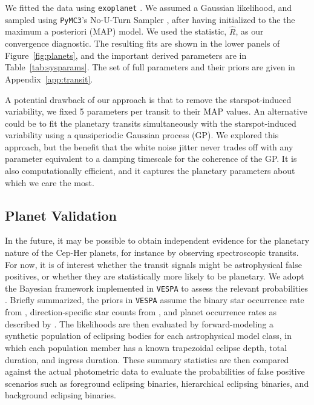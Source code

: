 \documentclass[12pt,twocolumn,tighten,linenumbers,trackchanges]{aastex63}
\begin{document}
We fitted the data using \texttt{exoplanet}
\citep{exoplanet:exoplanet}.  We assumed a Gaussian likelihood, and
sampled using \texttt{PyMC3}'s No-U-Turn Sampler
\citep{hoffman_no-u-turn_2014}, after having initialized to the the
maximum a posteriori (MAP) model.  We used the
\citet{gelman_inference_1992} statistic, $\hat{R}$, as our convergence
diagnostic.  The resulting fits are shown in the lower panels of
Figure~\ref{fig:planets}, and the important derived parameters are in
Table~\ref{tab:sysparams}.  The set of full parameters and their
priors are given in Appendix~\ref{app:transit}.

A potential drawback of our approach is that to remove
the starspot-induced variability, we fixed 5 
parameters per transit to their MAP values.
An alternative could be to fit the
planetary transits simultaneously with the starspot-induced
variability using a quasiperiodic Gaussian process (GP).  We explored
this approach, but  the benefit that the white noise jitter never
trades off with any parameter equivalent to a damping timescale for
the coherence of the GP.  It is also computationally efficient, and it
captures the planetary parameters about which we care the most.


\subsection{Planet Validation}

In the future, it may be possible to obtain independent evidence for
the planetary nature of the Cep-Her planets, for instance by observing
spectroscopic transits.  For now,
it is of interest whether the transit signals might be astrophysical
false positives, or whether they are statistically more likely to be
planetary.  We adopt the Bayesian framework implemented in
\texttt{VESPA} to assess the relevant probabilities
\citep{morton_efficient_2012,vespa_2015}.  Briefly summarized, the
priors in \texttt{VESPA} assume the binary star occurrence rate from
\citet{raghavan_survey_2010}, direction-specific star counts from
\citet{girardi_star_2005}, and planet occurrence rates as described by
\citet[][Section~3.4]{morton_efficient_2012}.  The likelihoods are
then evaluated by forward-modeling a synthetic population of eclipsing
bodies for each astrophysical model class, in which each population
member has a known trapezoidal eclipse depth, total duration, and
ingress duration.  These summary statistics are then compared against
the actual photometric data to evaluate the probabilities of false
positive scenarios such as foreground eclipsing binaries, hierarchical
eclipsing binaries, and background eclipsing binaries.
\end{document}
